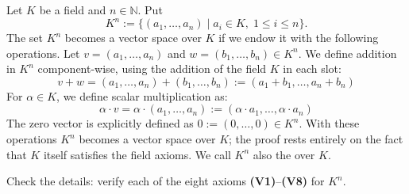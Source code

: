 \begin{example}
\label{ex:coordinate_space}
Let $K$ be a field and $n \in \mathbb{N}$. Put
\[
K^n := \{(a_1, \dots, a_n) \mid a_i \in K, \; 1 \le i \le n\}.
\]
The set $K^n$ becomes a vector space over $K$ if we endow it with the following operations.
Let $v = (a_1, \dots, a_n)$ and $w = (b_1, \dots, b_n) \in K^n$. We define addition in $K^n$ component-wise, using the addition of the field $K$ in each slot:
\[
v + w = (a_1, \dots, a_n) + (b_1, \dots, b_n) := (a_1 + b_1, \dots, a_n + b_n)
\]
For $\alpha \in K$, we define scalar multiplication as:
\[
\alpha \cdot v = \alpha \cdot (a_1, \dots, a_n) := (\alpha \cdot a_1, \dots, \alpha \cdot a_n)
\]
The zero vector is explicitly defined as $0 := (0, \dots, 0) \in K^n$.
With these operations $K^n$ becomes a vector space over $K$; the proof rests entirely on the fact that $K$ itself satisfies the field axioms. We call $K^n$ also the  over $K$.
\end{example}

\begin{exercise}
\label{exc:kn_axioms}
Check the details: verify each of the eight axioms \textbf{(V1)}--\textbf{(V8)} for $K^n$.
\end{exercise}

